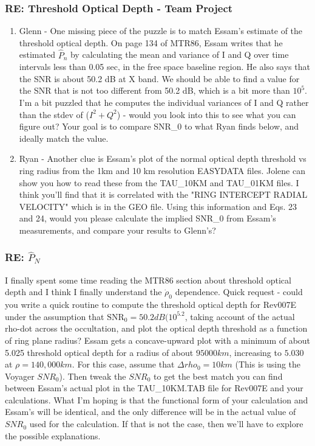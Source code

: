 \documentclass[crop=false,class=book]{standalone}
\begin{document}
\subsubsection{\footnotesize RE: Threshold Optical Depth - Team Project}
\begin{enumerate}
    \item Glenn - One missing piece of the puzzle is to match Essam's estimate of the threshold optical depth. On page 134 of MTR86, Essam writes that he estimated $\hat{P}_{n}$ by calculating the mean and variance of I and Q over time intervals less than 0.05 sec, in the free space baseline region. He also says that the SNR is about 50.2 dB at X band. We should be able to find a value for the SNR that is not too different from 50.2 dB, which is a bit more than $10^5$. I'm a bit puzzled that he computes the individual variances of I and Q rather than the stdev of ($I^2 + Q^2$) - would you  look into this to see what you can figure out? Your goal is to compare SNR\_0 to what Ryan finds below, and ideally match the value.
    \item Ryan -
    Another clue is Essam's plot of the normal optical depth threshold vs ring radius from the 1km and 10 km resolution EASYDATA files. Jolene can show you how to read these from the TAU\_10KM and TAU\_01KM files. I think you'll find that it is correlated with the "RING INTERCEPT RADIAL VELOCITY" which is in the GEO file. Using this information and Eqs. 23 and 24, would you please calculate the implied SNR\_0 from Essam's measurements, and compare your results to Glenn's?
\end{enumerate}
\subsubsection[RE: P\_N]{\footnotesize RE: $\hat{P}_{N}$}
I finally spent some time reading the MTR86 section about threshold optical depth and I think I finally understand the $\dot{\rho}_{0}$ dependence. Quick request - could you write a quick routine to compute the threshold optical depth for Rev007E under the assumption that $\textrm{SNR}_{0} = 50.2 dB (10^5.2$, taking account of the actual rho-dot across the occultation, and plot the optical depth threshold as a function of ring plane radius? Essam gets a concave-upward plot with a minimum of about 5.025 threshold optical depth for a radius of about $95000 km$, increasing to $5.030$ at $\rho=140,000 km$. For this case, assume that $\Delta rho_{0} = 10km$ (This is using the Voyager $SNR_{0}$). Then tweak the $SNR_{0}$ to get the best match you can find between Essam's actual plot in the TAU\_10KM.TAB file for Rev007E and your calculations. What I'm hoping is that the functional form of your calculation and Essam's will be identical, and the only difference will be in the actual value of $SNR_{0}$ used for the calculation. If that is not the case, then we'll have to explore the possible explanations.
\end{document}
